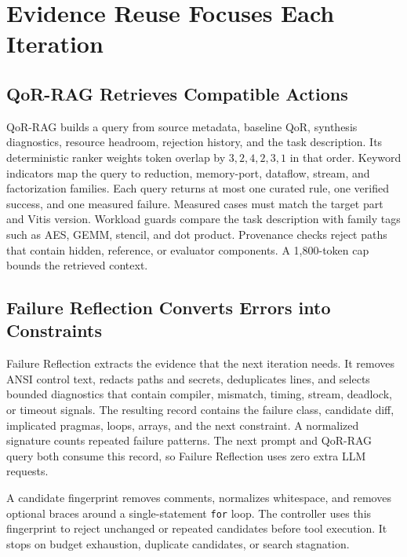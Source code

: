 \section{Evidence Reuse Focuses Each Iteration}

\subsection{QoR-RAG Retrieves Compatible Actions}

QoR-RAG builds a query from source metadata, baseline QoR, synthesis
diagnostics, resource headroom, rejection history, and the task description.
Its deterministic ranker weights token overlap by $3,2,4,2,3,1$ in that order.
Keyword indicators map the query to reduction, memory-port, dataflow, stream,
and factorization families. Each query returns at most one curated rule, one
verified success, and one measured failure. Measured cases must match the
target part and Vitis version. Workload guards compare the task description
with family tags such as AES, GEMM, stencil, and dot product. Provenance checks
reject paths that contain hidden, reference, or evaluator components. A
1,800-token cap bounds the retrieved context.

\subsection{Failure Reflection Converts Errors into Constraints}

Failure Reflection extracts the evidence that the next iteration needs. It
removes ANSI control text, redacts paths and secrets, deduplicates lines, and
selects bounded diagnostics that contain compiler, mismatch, timing, stream,
deadlock, or timeout signals. The resulting record contains the failure class,
candidate diff, implicated pragmas, loops, arrays, and the next constraint. A
normalized signature counts repeated failure patterns. The next prompt and
QoR-RAG query both consume this record, so Failure Reflection uses zero extra
LLM requests.

A candidate fingerprint removes comments, normalizes whitespace, and removes
optional braces around a single-statement \texttt{for} loop. The controller
uses this fingerprint to reject unchanged or repeated candidates before tool
execution. It stops on budget exhaustion, duplicate candidates, or search
stagnation.
